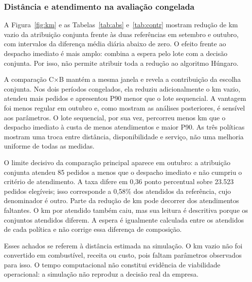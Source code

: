 
\subsubsection*{Distância e atendimento na avaliação congelada}

A Figura~\ref{fig:km} e as Tabelas~\ref{tab:abs} e~\ref{tab:contr} mostram redução de km vazio da atribuição conjunta frente às duas referências em setembro e outubro, com intervalos da diferença média diária abaixo de zero. O efeito frente ao despacho imediato é mais amplo: combina a espera pelo lote com a decisão conjunta. Por isso, não permite atribuir toda a redução ao algoritmo Húngaro.

A comparação C×B mantém a mesma janela e revela a contribuição da escolha conjunta. Nos dois períodos congelados, ela reduziu adicionalmente o km vazio, atendeu mais pedidos e apresentou P90 menor que o lote sequencial. A vantagem foi menos regular em outubro e, como mostram as análises posteriores, é sensível aos parâmetros. O lote sequencial, por sua vez, percorreu menos km que o despacho imediato à custa de menos atendimentos e maior P90. As três políticas mostram uma troca entre distância, disponibilidade e serviço, não uma melhoria uniforme de todas as medidas.

O limite decisivo da comparação principal aparece em outubro: a atribuição conjunta atendeu 85 pedidos a menos que o despacho imediato e não cumpriu o critério de atendimento. A taxa difere em 0,36 ponto percentual sobre 23.523 pedidos elegíveis; isso corresponde a 0,58\% dos atendidos da referência, cujo denominador é outro. Parte da redução de km pode decorrer dos atendimentos faltantes. O km por atendido também caiu, mas sua leitura é descritiva porque os conjuntos atendidos diferem. A espera é igualmente calculada entre os atendidos de cada política e não corrige essa diferença de composição.

Esses achados se referem à distância estimada na simulação. O km vazio não foi convertido em combustível, receita ou custo, pois faltam parâmetros observados para isso. O tempo computacional não constitui evidência de viabilidade operacional: a simulação não reproduz a decisão real da empresa.

